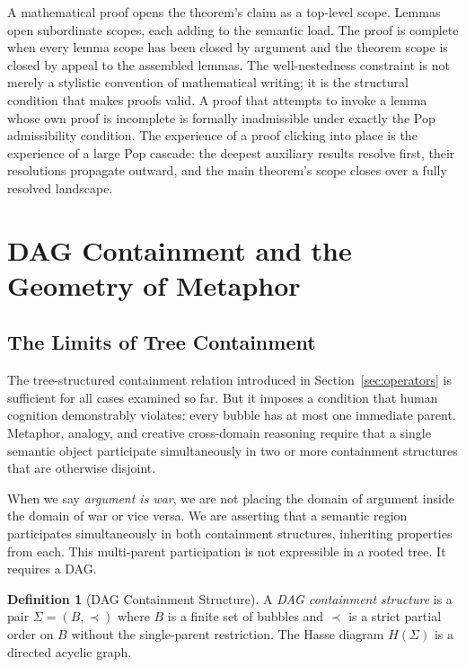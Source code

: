 \documentclass[12pt, a4paper]{article}
\theoremstyle{plain}
\theoremstyle{definition}
\newtheorem{definition}[theorem]{Definition}
\theoremstyle{remark}
\begin{document}
A mathematical proof opens the theorem's claim as a top-level scope. Lemmas
open subordinate scopes, each adding to the semantic load. The proof is
complete when every lemma scope has been closed by argument and the theorem
scope is closed by appeal to the assembled lemmas. The well-nestedness
constraint is not merely a stylistic convention of mathematical writing; it is
the structural condition that makes proofs valid. A proof that attempts to
invoke a lemma whose own proof is incomplete is formally inadmissible under
exactly the Pop admissibility condition. The experience of a proof clicking
into place is the experience of a large Pop cascade: the deepest auxiliary
results resolve first, their resolutions propagate outward, and the main
theorem's scope closes over a fully resolved landscape.


\section{DAG Containment and the Geometry of Metaphor}
\label{sec:dag}

\subsection{The Limits of Tree Containment}

The tree-structured containment relation introduced in Section~\ref{sec:operators}
is sufficient for all cases examined so far. But it imposes a condition that
human cognition demonstrably violates: every bubble has at most one immediate
parent. Metaphor, analogy, and creative cross-domain reasoning require that a
single semantic object participate simultaneously in two or more containment
structures that are otherwise disjoint.

When we say \emph{argument is war}, we are not placing the domain of argument
inside the domain of war or vice versa. We are asserting that a semantic
region participates simultaneously in both containment structures, inheriting
properties from each. This multi-parent participation is not expressible in a
rooted tree. It requires a DAG.

\begin{definition}[DAG Containment Structure]
A \emph{DAG containment structure} is a pair $\Sigma = (B, \prec)$ where $B$
is a finite set of bubbles and $\prec$ is a strict partial order on $B$
without the single-parent restriction. The Hasse diagram $H(\Sigma)$ is a
directed acyclic graph.
\end{definition}
\end{document}
